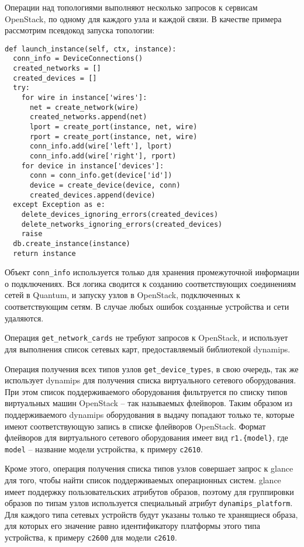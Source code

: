 Операции над топологиями выполняют несколько запросов к сервисам OpenStack, по одному для 
каждого узла и каждой связи.
В качестве примера рассмотрим псевдокод запуска топологии:
\begin{lstlisting}
def launch_instance(self, ctx, instance):
  conn_info = DeviceConnections()
  created_networks = []
  created_devices = []
  try:
    for wire in instance['wires']:
      net = create_network(wire)
      created_networks.append(net)
      lport = create_port(instance, net, wire)
      rport = create_port(instance, net, wire)
      conn_info.add(wire['left'], lport)
      conn_info.add(wire['right'], rport)
    for device in instance['devices']:
      conn = conn_info.get(device['id'])
      device = create_device(device, conn)
      created_devices.append(device)
  except Exception as e:
    delete_devices_ignoring_errors(created_devices)
    delete_networks_ignoring_errors(created_devices)
    raise
  db.create_instance(instance)
  return instance
\end{lstlisting}
Объект \verb`conn_info` используется только для хранения промежуточной информации о 
подключениях.
Вся логика сводится к созданию соответствующих соединениям сетей в Quantum, и запуску
узлов в OpenStack, подключенных к соответствующим сетям. В случае любых ошибок
созданные устройства и сети удаляются.

Операция \verb`get_network_cards` не требуют запросов к OpenStack, и использует для выполнения 
список сетевых карт, предоставляемый библиотекой dynamips. 

Операция получения всех типов узлов \verb`get_device_types`, в свою очередь,
так же использует dynamips для получения списка виртуального сетевого оборудования.
При этом список поддерживаемого оборудования фильтруется по списку типов виртуальных
машин OpenStack -- так называемых флейворов. Таким образом из поддерживаемого
dynamips оборудования в выдачу попадают только те, которые имеют соответствующую запись
в списке флейворов OpenStack. Формат флейворов для виртуального сетевого оборудования 
имеет вид \verb`r1.{model}`, где \verb`model` -- название модели устройства, к примеру 
\verb`c2610`.

Кроме этого, операция получения списка типов узлов совершает запрос к glance для того, чтобы 
найти список поддерживаемых операционных систем.  glance имеет поддержку пользовательских
атрибутов образов, поэтому для группировки образов по типам узлов используется специальный
атрибут \verb`dynamips_platform`.
Для каждого типа сетевых устройств будут указаны
только те хранящиеся образа, для которых его значение равно идентификатору платформы
этого типа устройства, к примеру \verb`c2600` для модели \verb`c2610`.

